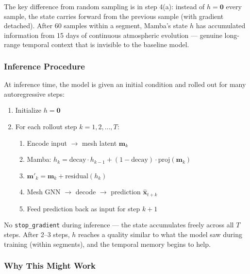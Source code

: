 \documentclass[11pt,a4paper]{article}
\begin{document}
The key difference from random sampling is in step 4(a): instead of $h = \mathbf{0}$ every sample, the state carries forward from the previous sample (with gradient detached). After 60 samples within a segment, Mamba's state $h$ has accumulated information from 15 days of continuous atmospheric evolution — genuine long-range temporal context that is invisible to the baseline model.

\subsubsection{Inference Procedure}

At inference time, the model is given an initial condition and rolled out for many autoregressive steps:

\begin{enumerate}[nosep]
  \item Initialize $h = \mathbf{0}$
  \item For each rollout step $k = 1, 2, \ldots, T$:
  \begin{enumerate}[nosep]
    \item Encode input $\to$ mesh latent $\mathbf{m}_k$
    \item Mamba: $h_k = \text{decay} \cdot h_{k-1} + (1-\text{decay}) \cdot \text{proj}(\mathbf{m}_k)$
    \item $\mathbf{m}'_k = \mathbf{m}_k + \text{residual}(h_k)$
    \item Mesh GNN $\to$ decode $\to$ prediction $\hat{\mathbf{x}}_{t+k}$
    \item Feed prediction back as input for step $k+1$
  \end{enumerate}
\end{enumerate}

No \texttt{stop\_gradient} during inference — the state accumulates freely across all $T$ steps. After 2--3 steps, $h$ reaches a quality similar to what the model saw during training (within segments), and the temporal memory begins to help.

\subsubsection{Why This Might Work}
\end{document}
